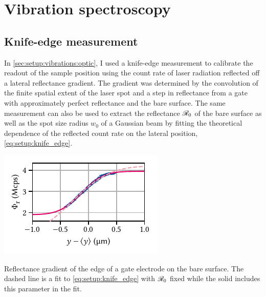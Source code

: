 \chapter{Vibration spectroscopy}\label{ch:app:setup:vibrations}
\section{Knife-edge measurement}\label{sec:app:setup:vibrations:knife_edge}
In \cref{sec:setup:vibrations:optic}, I used a knife-edge measurement to calibrate the readout of the sample position using the count rate of laser radiation reflected off a lateral reflectance gradient.
The gradient was determined by the convolution of the finite spatial extent of the laser spot and a step in reflectance from a  gate with approximately perfect reflectance and the bare  surface.
The same measurement can also be used to extract the reflectance $\mathscr{R}_{0}$ of the bare  surface as well as the spot size radius $w_0$ of a Gaussian beam by fitting the theoretical dependence of the reflected count rate on the lateral position, \cref{eq:setup:knife_edge}.

\begin{marginfigure}
    \centering
    \includegraphics{img/pdf/setup/knife_edge_erf}
    \caption[]{
        Reflectance gradient of the edge of a  gate electrode on the bare  surface.
        The dashed line is a fit to \cref{eq:setup:knife_edge} with $\mathscr{R}_0$ fixed while the solid includes this parameter in the fit.
    }
    \label{fig:app:setup:vibrations:knife_edge}
\end{marginfigure}

